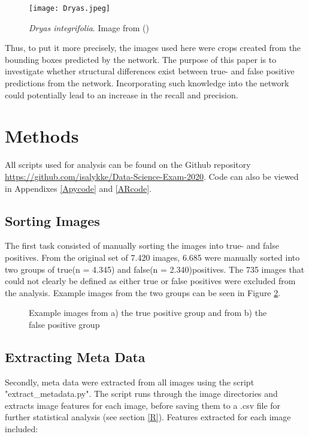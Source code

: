 \documentclass[12pt]{article}
\begin{document}
\begin{figure}[h]
	\begin{center}
		\texttt{[image: Dryas.jpeg]}
	\end{center}
	\caption{\textit{Dryas integrifolia}. Image from (\cite{DryasIntegrifolia2020})}
	\label{fig:dryas}
\end{figure}

Thus, to put it more precisely, the images used here were crops created from the bounding boxes predicted by the network. The purpose of this paper is to investigate whether structural differences exist between true- and false positive predictions from the network. Incorporating such knowledge into the network could potentially lead to an increase in the recall and precision.

\section{Methods}
All scripts used for analysis can be found on the Github repository \url{https://github.com/isalykke/Data-Science-Exam-2020}. Code can also be viewed in Appendixes \ref{Apycode} and \ref{ARcode}.

\subsection{Sorting Images}
The first task consisted of manually sorting the images into true- and false positives. 
From the original set of 7.420 images, 6.685 were manually sorted into two groups of true(n = 4.345) and false(n = 2.340)positives. The 735 images that could not clearly be defined as either true or false positives were excluded from the analysis. Example images from the two groups can be seen in Figure \ref{fig:groupex}.


\begin{figure}[ht]
	\begin{center}
		\hfill
		\caption{Example images from a) the true positive group and from b) the false positive group} 
		\label{fig:groupex}
	\end{center}
\end{figure}

\subsection{Extracting Meta Data}
Secondly, meta data were extracted from all images using the script "extract\_metadata.py". The script runs through the image directories and extracts image features for each image, before saving them to a .csv file for further statistical  analysis (see section \ref{R}).
Features extracted for each image included:
\end{document}
